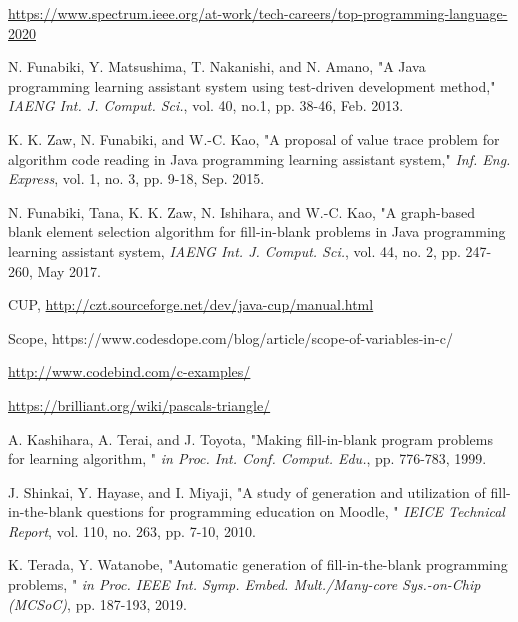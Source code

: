 \documentclass[technicalreport]{ieicej}
\begin{document}
%
%
\begin{thebibliography}{99}%
    \url{https://www.spectrum.ieee.org/at-work/tech-careers/top-programming-language-2020}

    N. Funabiki, Y. Matsushima, T. Nakanishi, and N. Amano, "A Java programming learning assistant system using test-driven development method," \emph{IAENG Int. J. Comput. Sci.}, vol. 40, no.1, pp. 38-46, Feb. 2013.
    
    K. K. Zaw, N. Funabiki, and W.-C. Kao, "A proposal of value trace problem for algorithm code reading in Java programming learning assistant system," \emph{Inf. Eng. Express}, vol. 1, no. 3, pp. 9-18, Sep. 2015.
    
    N. Funabiki, Tana, K. K. Zaw, N. Ishihara, and W.-C. Kao, "A graph-based blank element selection algorithm for fill-in-blank problems in Java programming learning assistant system, \emph{IAENG Int. J. Comput. Sci.}, vol. 44, no. 2, pp. 247-260, May 2017.
    
    CUP, \url{http://czt.sourceforge.net/dev/java-cup/manual.html}
    
    Scope, https://www.codesdope.com/blog/article/scope-of-variables-in-c/
    
    \url{http://www.codebind.com/c-examples/}
    
    \url{https://brilliant.org/wiki/pascals-triangle/}
    
    A. Kashihara, A. Terai, and J. Toyota, "Making fill-in-blank program problems for learning algorithm, " \emph{in Proc. Int. Conf. Comput. Edu.}, pp. 776-783, 1999.
    
    J. Shinkai, Y. Hayase, and I. Miyaji, "A study of generation and utilization of fill-in-the-blank questions for programming education on Moodle, " \emph{IEICE Technical Report}, vol. 110, no. 263, pp. 7-10, 2010.
    
    K. Terada, Y. Watanobe, "Automatic generation of fill-in-the-blank programming problems, " \emph{in Proc. IEEE Int. Symp. Embed. Mult./Many-core Sys.-on-Chip (MCSoC)}, pp. 187-193, 2019.
\end{thebibliography}
\end{document}
